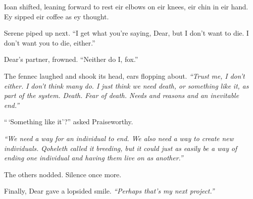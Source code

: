 Ioan shifted, leaning forward to rest eir elbows on eir knees, eir chin in eir hand. Ey sipped eir coffee as ey thought.

Serene piped up next. ``I get what you're saying, Dear, but I don't want to die. I don't want you to die, either.''

Dear's partner, frowned. ``Neither do I, fox.''

The fennec laughed and shook its head, ears flopping about. \emph{``Trust me, I don't either. I don't think many do. I just think we need death, or something like it, as part of the system. Death. Fear of death. Needs and reasons and an inevitable end.''}

``\,`Something like it'?'' asked Praiseworthy.

\emph{``We need a way for an individual to end. We also need a way to create new individuals. Qoheleth called it breeding, but it could just as easily be a way of ending one individual and having them live on as another.''}

The others nodded. Silence once more.

Finally, Dear gave a lopsided smile. \emph{``Perhaps that's my next project.''}
